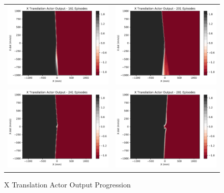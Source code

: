 \begin{figure}
\begin{tabular}{cc}
		\includegraphics[width=65mm]{figures/train_figs/transx_actor/Actor1_161.pdf} &   \includegraphics[width=65mm]{figures/train_figs/transx_actor/Actor1_201.pdf} \\
		\includegraphics[width=65mm]{figures/train_figs/transx_actor/Actor1_241.pdf} &   \includegraphics[width=65mm]{figures/train_figs/transx_actor/Actor1_281.pdf} \\
	\end{tabular}
	\caption{X Translation Actor Output Progression}\label{fig:x_actor_contour}
\end{figure}
